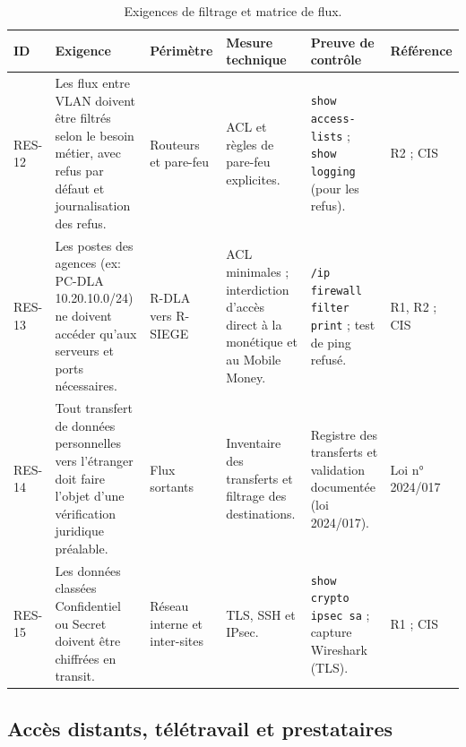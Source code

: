 \documentclass[11pt,a4paper]{article}
\begin{document}
	\scriptsize
	\begin{longtable}{p{0.7cm} p{3.95cm} p{1.95cm} p{3.2cm} p{3.0cm} p{1.8cm}}
		\caption{Exigences de filtrage et matrice de flux.}\\
		\hline
		\textbf{ID} & \textbf{Exigence} & \textbf{Périmètre} & \textbf{Mesure technique} & \textbf{Preuve de contrôle} & \textbf{Référence}\\
		\hline
		\endhead
		RES-12 & Les flux entre VLAN doivent être filtrés selon le besoin métier, avec refus par défaut et journalisation des refus. & Routeurs et pare-feu & ACL et règles de pare-feu explicites. & \texttt{show access-lists} ; \texttt{show logging} (pour les refus). & R2 ; CIS\\
		\hline
		RES-13 & Les postes des agences (ex: PC-DLA 10.20.10.0/24) ne doivent accéder qu'aux serveurs et ports nécessaires. & R-DLA vers R-SIEGE & ACL minimales ; interdiction d'accès direct à la monétique et au Mobile Money. & \texttt{/ip firewall filter print} ; test de ping refusé. & R1, R2 ; CIS\\
		\hline
		RES-14 & Tout transfert de données personnelles vers l'étranger doit faire l'objet d'une vérification juridique préalable. & Flux sortants & Inventaire des transferts et filtrage des destinations. & Registre des transferts et validation documentée (loi 2024/017). & Loi n° 2024/017\\
		\hline
		RES-15 & Les données classées Confidentiel ou Secret doivent être chiffrées en transit. & Réseau interne et inter-sites & TLS, SSH et IPsec. & \texttt{show crypto ipsec sa} ; capture Wireshark (TLS). & R1 ; CIS\\
		\hline
	\end{longtable}
	\normalsize
	
	\subsection{Accès distants, télétravail et prestataires}
	
\end{document}
